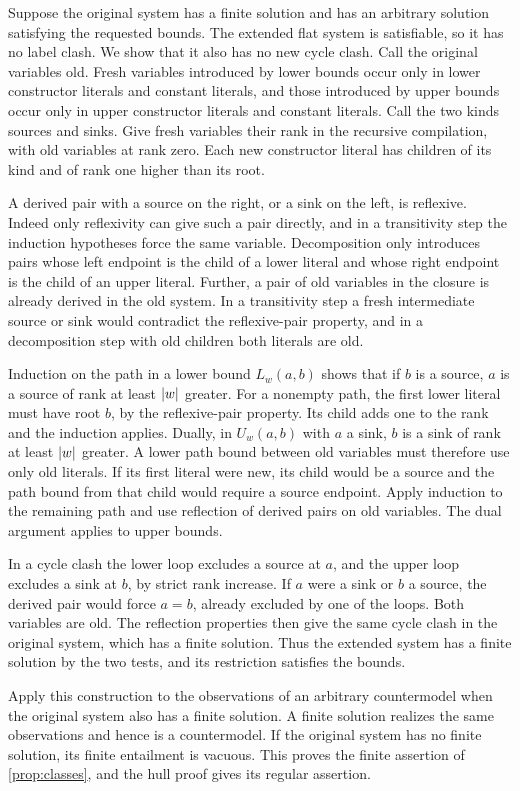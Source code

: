 Suppose the original system has a finite solution and has an arbitrary
solution satisfying the requested bounds. The extended flat system is
satisfiable, so it has no label clash. We show that it also has no new
cycle clash. Call the original variables old. Fresh variables introduced
by lower bounds occur only in lower constructor literals and constant
literals, and those introduced by upper bounds occur only in upper
constructor literals and constant literals. Call the two kinds sources
and sinks. Give fresh variables their rank in the recursive compilation,
with old variables at rank zero. Each new constructor literal has
children of its kind and of rank one higher than its root.

A derived pair with a source on the right, or a sink on the left,
is reflexive. Indeed only reflexivity can give such a pair directly,
and in a transitivity step the induction hypotheses force the same
variable. Decomposition only introduces pairs whose left endpoint
is the child of a lower literal and whose right endpoint is the
child of an upper literal. Further, a pair of old variables in the
closure is already derived in the old system. In a transitivity
step a fresh intermediate source or sink would contradict the
reflexive-pair property, and in a decomposition step with old
children both literals are old.

Induction on the path in a lower bound $L_w(a,b)$ shows that if $b$ is
a source, $a$ is a source of rank at least $\lvert w\rvert$ greater. For a
nonempty path, the first lower literal must have root $b$, by the
reflexive-pair property. Its child adds one to the rank and the
induction applies. Dually, in $U_w(a,b)$ with $a$ a sink, $b$ is a
sink of rank at least $\lvert w\rvert$ greater. A lower path bound between
old variables must therefore use only old literals. If its first
literal were new, its child would be a source and the path bound
from that child would require a source endpoint. Apply induction to
the remaining path and use reflection of derived pairs on old
variables. The dual argument applies to upper bounds.

In a cycle clash the lower loop excludes a source at $a$, and the
upper loop excludes a sink at $b$, by strict rank increase.
If $a$ were a sink or $b$ a source, the derived pair would force
$a=b$, already excluded by one of the loops. Both variables are old.
The reflection properties then give the same cycle clash in the
original system, which has a finite solution. Thus the extended
system has a finite solution by the two tests, and its restriction
satisfies the bounds.

Apply this construction to the observations of an arbitrary
countermodel when the original system also has a finite solution.
A finite solution realizes the same observations and hence is
a countermodel. If the original system has no finite solution,
its finite entailment is vacuous. This proves the finite assertion
of \cref{prop:classes}, and the hull proof gives its regular
assertion.
